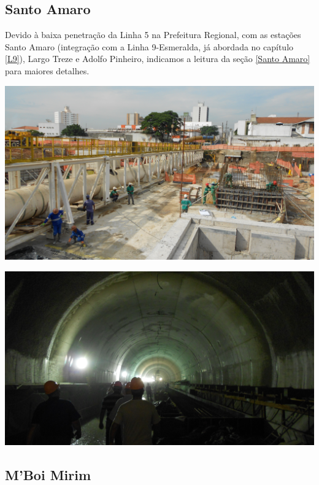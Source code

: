 	\subsection{Santo Amaro}
	
	Devido à baixa penetração da Linha 5 na Prefeitura Regional, com as estações Santo Amaro (integração com a Linha 9-Esmeralda, já abordada no capítulo \ref{L9}), Largo Treze e Adolfo Pinheiro, indicamos a leitura da seção \ref{Santo Amaro} para maiores detalhes.

	\noindent
	\begin{minipage}[b]{.4\textwidth}
		\includegraphics[width=\linewidth]{fotos/DSCN0424.jpg}
	\end{minipage}%
	\hfill
	\begin{minipage}[b]{.4\linewidth}
		\includegraphics[width=\textwidth]{fotos/DSCN0488.jpg}
	\end{minipage}	
	
	\subsection{M’Boi Mirim}
	
